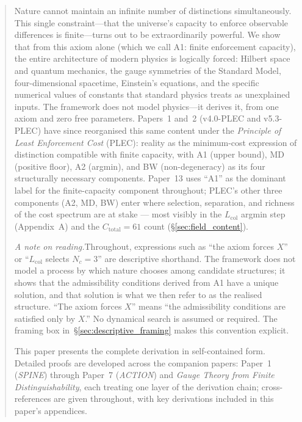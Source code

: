\documentclass[11pt]{article}
\begin{document}
\begin{abstract}
\noindent
Nature cannot maintain an infinite number of distinctions simultaneously.  This single constraint---that the universe's capacity to enforce observable differences is finite---turns out to be extraordinarily powerful.  We show that from this axiom alone (which we call A1: finite enforcement capacity), the entire architecture of modern physics is logically forced: Hilbert space and quantum mechanics, the gauge symmetries of the Standard Model, four-dimensional spacetime, Einstein's equations, and the specific numerical values of constants that standard physics treats as unexplained inputs.  The framework does not model physics---it derives it, from one axiom and zero free parameters.  Papers~1 and~2 (v4.0-PLEC and v5.3-PLEC) have since reorganised this same content under the \emph{Principle of Least Enforcement Cost} (PLEC): reality as the minimum-cost expression of distinction compatible with finite capacity, with A1 (upper bound), MD (positive floor), A2 (argmin), and BW (non-degeneracy) as its four structurally necessary components.  Paper~13 uses ``A1'' as the dominant label for the finite-capacity component throughout; PLEC's other three components (A2, MD, BW) enter where selection, separation, and richness of the cost spectrum are at stake --- most visibly in the $L_{\mathrm{col}}$ argmin step (Appendix~A) and the $C_{\mathrm{total}}=61$ count (\S\ref{sec:field_content}).

\noindent\textit{A note on reading.}\quad Throughout, expressions such as ``the axiom forces $X$'' or ``$L_{\mathrm{col}}$ selects $N_c = 3$'' are descriptive shorthand.  The framework does not model a process by which nature chooses among candidate structures; it shows that the admissibility conditions derived from A1 have a unique solution, and that solution is what we then refer to as the realised structure.  ``The axiom forces $X$'' means ``the admissibility conditions are satisfied only by $X$.''  No dynamical search is assumed or required.  The framing box in~\S\ref{sec:descriptive_framing} makes this convention explicit.

This paper presents the complete derivation in self-contained form.  Detailed proofs are developed across the companion papers: Paper~1 (\textit{SPINE}) through Paper~7 (\textit{ACTION}) and \textit{Gauge Theory from Finite Distinguishability}, each treating one layer of the derivation chain; cross-references are given throughout, with key derivations included in this paper's appendices.


\end{abstract}
\end{document}
